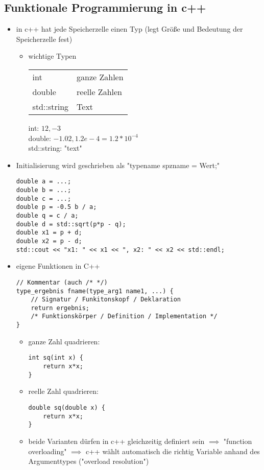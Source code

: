 \documentclass[a4paper]{scrartcl}
\theoremstyle{definition}
\theoremstyle{plain}
\theoremstyle{remark}
\theoremstyle{remark}
\begin{document}
\subsection{Funktionale Programmierung in c++}
\label{sec-6-3}
\begin{itemize}
\item in c++ hat jede Speicherzelle einen Typ (legt Größe und Bedeutung der Speicherzelle fest)
\begin{itemize}
\item wichtige Typen
\begin{center}
\begin{tabular}{ll}
int & ganze Zahlen\\
double & reelle Zahlen\\
std::string & Text\\
\end{tabular}
\end{center}
int: $12,-3$ \\
       double: $-1.02,1.2e-4 = 1.2*10^{-4}$ \\
       std::string: "text"
\end{itemize}
\item Initialisierung wird geschrieben als "typename spzname = Wert;"
\begin{verbatim}
double a = ...;
double b = ...;
double c = ...;
double p = -0.5 b / a;
double q = c / a;
double d = std::sqrt(p*p - q);
double x1 = p + d;
double x2 = p - d;
std::cout << "x1: " << x1 << ", x2: " << x2 << std::endl;
\end{verbatim}
\item eigene Funktionen in C++
\begin{verbatim}
// Kommentar (auch /* */)
type_ergebnis fname(type_arg1 name1, ...) {
	// Signatur / Funkitonskopf / Deklaration
	return ergebnis;
	/* Funktionskörper / Definition / Implementation */
}
\end{verbatim}
\begin{itemize}
\item ganze Zahl quadrieren:
\begin{verbatim}
int sq(int x) {
	return x*x;
}
\end{verbatim}
\item reelle Zahl quadrieren:
\begin{verbatim}
double sq(double x) {
	return x*x;
}
\end{verbatim}
\item beide Varianten dürfen in c++ gleichzeitig definiert sein $\implies$ "function overloading" $\implies$ c++ wählt automatisch die richtig Variable anhand des Argumenttypes ("overload resolution")

\end{itemize}
\end{itemize}
\end{document}
